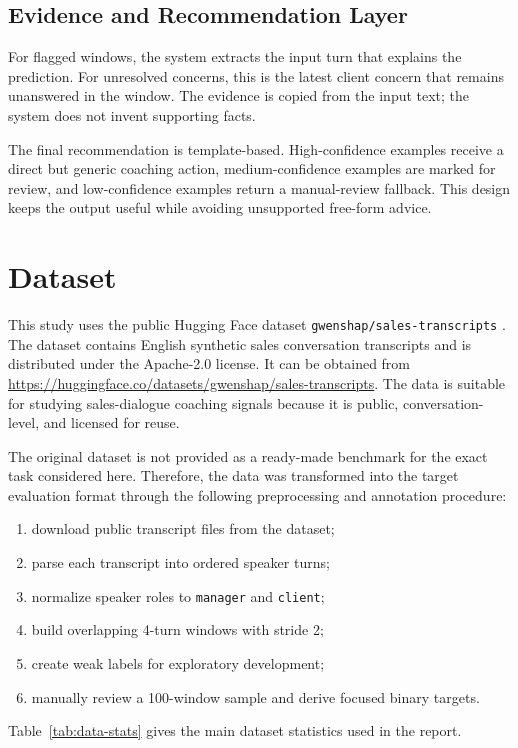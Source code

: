 \documentclass{article}
\begin{document}
\subsection{Evidence and Recommendation Layer}
For flagged windows, the system extracts the input turn that explains the prediction. For unresolved concerns, this is the latest client concern that remains unanswered in the window. The evidence is copied from the input text; the system does not invent supporting facts.

The final recommendation is template-based. High-confidence examples receive a direct but generic coaching action, medium-confidence examples are marked for review, and low-confidence examples return a manual-review fallback. This design keeps the output useful while avoiding unsupported free-form advice.

\section{Dataset}
This study uses the public Hugging Face dataset \texttt{gwenshap/sales-transcripts} \cite{gwenshapSalesTranscripts}. The dataset contains English synthetic sales conversation transcripts and is distributed under the Apache-2.0 license. It can be obtained from \url{https://huggingface.co/datasets/gwenshap/sales-transcripts}. The data is suitable for studying sales-dialogue coaching signals because it is public, conversation-level, and licensed for reuse.

The original dataset is not provided as a ready-made benchmark for the exact task considered here. Therefore, the data was transformed into the target evaluation format through the following preprocessing and annotation procedure:
\begin{enumerate}
    \item download public transcript files from the dataset;
    \item parse each transcript into ordered speaker turns;
    \item normalize speaker roles to \texttt{manager} and \texttt{client};
    \item build overlapping 4-turn windows with stride 2;
    \item create weak labels for exploratory development;
    \item manually review a 100-window sample and derive focused binary targets.
\end{enumerate}

Table~\ref{tab:data-stats} gives the main dataset statistics used in the report.
\end{document}
